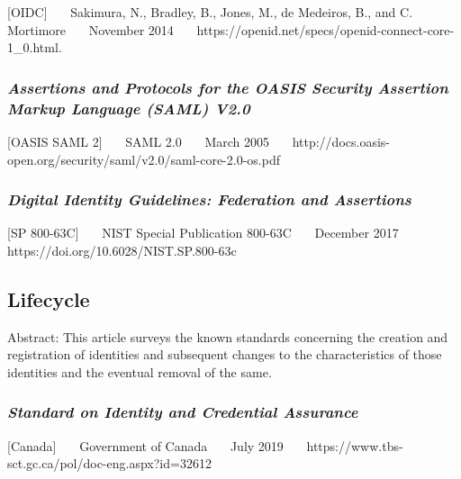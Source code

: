 {[}OIDC{]}~~~ Sakimura, N., Bradley, B., Jones, M., de Medeiros, B., and
C. Mortimore~~~ November 2014~~~
https://openid.net/specs/openid-connect-core-1\_0.html.~~~

\hypertarget{assertions-and-protocols-for-the-oasis-security-assertion-markup-language-saml-v2.0}{%
\subsubsection{\texorpdfstring{\emph{Assertions and Protocols for the OASIS
Security Assertion Markup Language (SAML)
V2.0}}{Assertions and Protocols for the OASIS Security Assertion Markup Language (SAML) V2.0}}\label{assertions-and-protocols-for-the-oasis-security-assertion-markup-language-saml-v2.0}}

{[}OASIS SAML 2{]}~~~ SAML 2.0~~~ March 2005~~~
http://docs.oasis-open.org/security/saml/v2.0/saml-core-2.0-os.pdf~~~

\hypertarget{digital-identity-guidelines-federation-and-assertions}{%
\subsubsection{\texorpdfstring{\emph{Digital Identity Guidelines: Federation
and
Assertions}}{Digital Identity Guidelines: Federation and Assertions}}\label{digital-identity-guidelines-federation-and-assertions}}

{[}SP 800-63C{]}~~~ NIST Special Publication 800-63C~~~ December 2017~~~
https://doi.org/10.6028/NIST.SP.800-63c~~~

\hypertarget{lifecycle}{%
\subsection{Lifecycle}\label{lifecycle}}

Abstract: This article surveys the known standards concerning the
creation and registration of identities and subsequent changes to the
characteristics of those identities and the eventual removal of the
same.

\hypertarget{standard-on-identity-and-credential-assurance}{%
\subsubsection{\texorpdfstring{\emph{Standard on Identity and Credential
Assurance}}{Standard on Identity and Credential Assurance}}\label{standard-on-identity-and-credential-assurance}}

{[}Canada{]}~~~ Government of Canada~~~ July 2019~~~
https://www.tbs-sct.gc.ca/pol/doc-eng.aspx?id=32612

